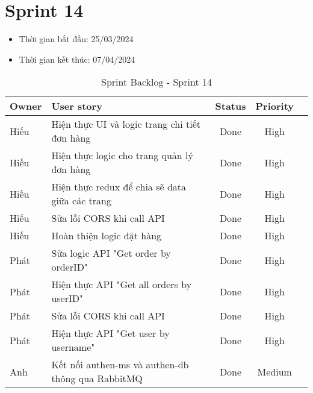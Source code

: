 \section{Sprint 14}
\begin{itemize}
    \item Thời gian bắt đầu: 25/03/2024
    \item Thời gian kết thúc: 07/04/2024
\end{itemize}
\begin{table}[H]
    \begin{tabular}{|m{2.5cm}|m{9cm}|c|c|c|}
    \hline
    \textbf{Owner}  & \textbf{User story}                                & \textbf{Status}  & \textbf{Priority} \\ \hline
    Hiếu                & Hiện thực UI và logic trang chi tiết đơn hàng                   & Done                              & High         \\ \hline
    Hiếu               & Hiện thực logic cho trang quản lý đơn hàng                   & Done                              & High         \\ \hline
    Hiếu                & Hiện thực redux để chia sẽ data giữa các trang                 & Done                              & High         \\ \hline
    Hiếu               & Sửa lỗi CORS khi call API                     & Done                             & High         \\ \hline
    Hiếu               & Hoàn thiện logic đặt hàng                     & Done                              & High         \\ \hline
    Phát               & Sửa logic API "Get order by orderID"                     & Done                              & High         \\ \hline
    Phát               & Hiện thực API "Get all orders by userID"                    & Done                              & High         \\ \hline
    Phát               & Sửa lỗi CORS khi call API                     & Done                              & High         \\ \hline
    Phát               & Hiện thực API "Get user by username"                    & Done                              & High         \\ \hline
    Anh              & Kết nối authen-ms và authen-db thông qua RabbitMQ                     & Done                              & Medium        \\ \hline
    \end{tabular}
    \caption{Sprint Backlog - Sprint 14}
    \label{tab:sprint-14}
\end{table}
